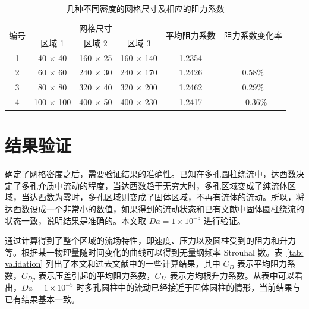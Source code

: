 \begin{table}[ht]
	\caption{几种不同密度的网格尺寸及相应的阻力系数}\label{tab: grid}
	\vspace{.5em}\centering\wuhao
	\begin{tabular}{cccccc}
		\toprule[1.5pt]
		\multirow{2}[3]{*}{编号} & \multicolumn{3}{c}{网格尺寸} & \multirow{2}[3]{*}{平均阻力系数} & \multirow{2}[3]{*}{阻力系数变化率} \\
		\cmidrule[.67pt](lr){2-4}
		& 区域 1 & 区域 2 & 区域 3 & & \\
		\midrule[1pt]
		1 & 40 $\times$ 40 & 160 $\times$ 25 & 160 $\times$ 140 & 1.2354 & — \\
		2 & 60 $\times$ 60 & 240 $\times$ 30 & 240 $\times$ 170 & 1.2426 & 0.58\% \\
		3 & 80 $\times$ 80 & 320 $\times$ 40 & 320 $\times$ 200 & 1.2462 & 0.29\% \\
		4 & 100 $\times$ 100 & 400 $\times$ 50 & 400 $\times$ 230 & 1.2417 & $-0.36\%$ \\
		\bottomrule[1.5pt]
	\end{tabular}
\end{table}

\section{结果验证}\label{sec: result validation}

确定了网格密度之后，需要验证结果的准确性。已知在多孔圆柱绕流中，达西数决定了多孔介质中流动的程度，当达西数趋于无穷大时，多孔区域变成了纯流体区域，当达西数为零时，多孔区域则变成了固体区域，不再有流体的流动。所以，将达西数设成一个非常小的数值，如果得到的流动状态和已有文献中固体圆柱绕流的状态一致，说明结果是准确的。本文取 $Da=1\times 10^{-5}$ 进行验证。

通过计算得到了整个区域的流场特性，即速度、压力以及圆柱受到的阻力和升力等。根据某一物理量随时间变化的曲线可以得到无量纲频率 Strouhal 数。表~\ref{tab: validation} 列出了本文和过去文献中的一些计算结果，其中 $C_D$ 表示平均阻力系数，$C_{Dp}$ 表示压差引起的平均阻力系数，$C_{L'}$ 表示方均根升力系数。从表中可以看出，$Da=1\times 10^{-5}$ 时多孔圆柱中的流动已经接近于固体圆柱的情形，当前结果与已有结果基本一致。

